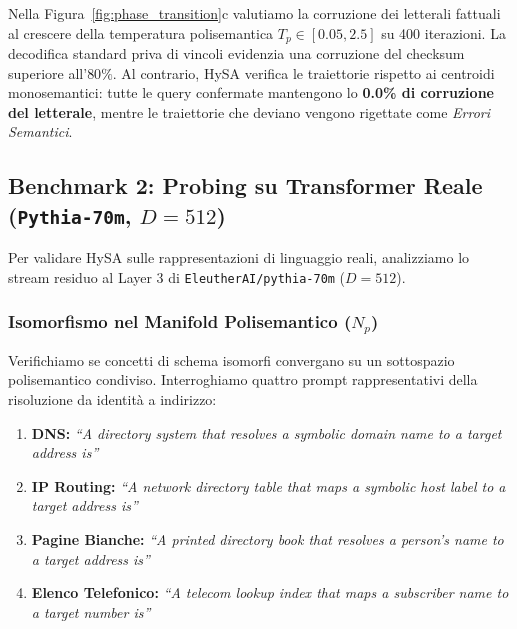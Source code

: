 \documentclass[11pt,a4paper]{article}
\theoremstyle{definition}
\begin{document}
Nella Figura~\ref{fig:phase_transition}c valutiamo la corruzione dei letterali fattuali al crescere della temperatura polisemantica $T_p \in [0.05, 2.5]$ su 400 iterazioni. La decodifica standard priva di vincoli evidenzia una corruzione del checksum superiore all'$80\%$. Al contrario, HySA verifica le traiettorie rispetto ai centroidi monosemantici: tutte le query confermate mantengono lo \textbf{0.0\% di corruzione del letterale}, mentre le traiettorie che deviano vengono rigettate come \textit{Errori Semantici}.

\subsection{Benchmark 2: Probing su Transformer Reale (\texorpdfstring{\texttt{Pythia-70m}}{Pythia-70m}, \texorpdfstring{$D=512$}{D=512})}
Per validare HySA sulle rappresentazioni di linguaggio reali, analizziamo lo stream residuo al Layer 3 di \texttt{EleutherAI/pythia-70m} ($D=512$).

\subsubsection{Isomorfismo nel Manifold Polisemantico \texorpdfstring{($N_p$)}{(Np)}}
Verifichiamo se concetti di schema isomorfi convergano su un sottospazio polisemantico condiviso. Interroghiamo quattro prompt rappresentativi della risoluzione da identità a indirizzo:
\begin{enumerate}[leftmargin=*, itemsep=1.5pt]
    \item \textbf{DNS:} \textit{``A directory system that resolves a symbolic domain name to a target address is''}
    \item \textbf{IP Routing:} \textit{``A network directory table that maps a symbolic host label to a target address is''}
    \item \textbf{Pagine Bianche:} \textit{``A printed directory book that resolves a person's name to a target address is''}
    \item \textbf{Elenco Telefonico:} \textit{``A telecom lookup index that maps a subscriber name to a target number is''}
\end{enumerate}
\end{document}
